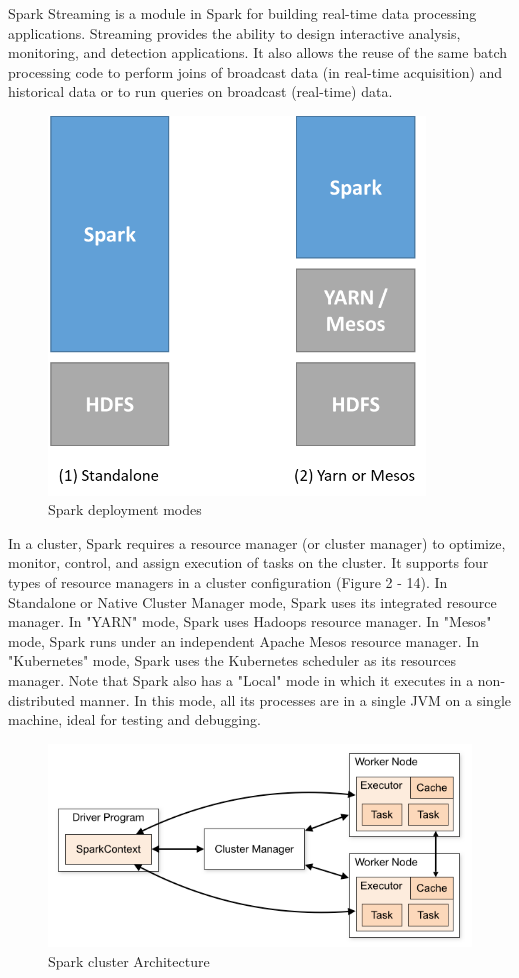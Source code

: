 \documentclass[12pt,english]{book}
\begin{document}
Spark Streaming is a module in Spark for building real-time data processing applications.
Streaming provides the ability to design interactive analysis, monitoring, and detection applications.
It also allows the reuse of the same batch processing code to perform joins of broadcast data (in real-time acquisition) and historical data or to run queries on broadcast (real-time) data.

\begin{figure}[h]
	\centering
	\includegraphics[width=10cm]{sparkConfig.png}
	\caption{Spark deployment modes}
\end{figure}

In a cluster, Spark requires a resource manager (or cluster manager) to optimize, monitor, control, and assign execution of tasks on the cluster.
It supports four types of resource managers in a cluster configuration (Figure 2 - 14).
In Standalone or Native Cluster Manager mode, Spark uses its integrated resource manager.
In "YARN" mode, Spark uses Hadoops resource manager.
In "Mesos" mode, Spark runs under an independent Apache Mesos resource manager.
In "Kubernetes" mode, Spark uses the Kubernetes scheduler as its resources manager.
Note that Spark also has a "Local" mode in which it executes in a non-distributed manner.
In this mode, all its processes are in a single JVM on a single machine, ideal for testing and debugging.

\begin{figure}[h]
	\centering
	\includegraphics[width=\linewidth]{sparkArch.png}
	\caption[Spark cluster Architecture]{Spark cluster Architecture \footnotemark}
	\label{fig:sparkClusterArchitecture}
\end{figure}
\end{document}
